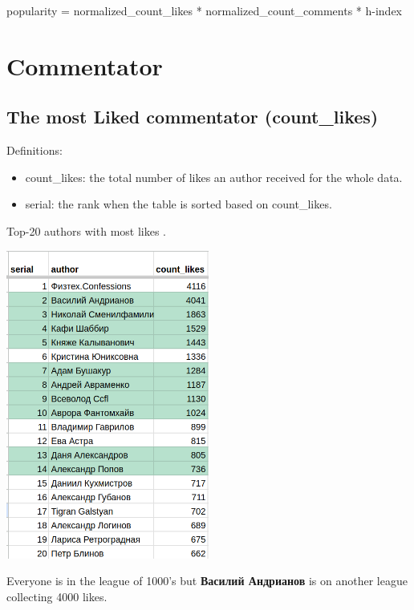 \documentclass[
	12pt
] {article}
\begin{document}
	popularity = normalized\_count\_likes * normalized\_count\_comments * h-index


\section{Commentator}
\subsection{The most Liked commentator (count\_likes)}
	Definitions:
	\begin{itemize}
		\item count\_likes: the total number of likes an author received for the whole data.
		\item serial: the rank when the table is sorted based on count\_likes.
	\end{itemize}

	\begin{table}[H]
		\centering
		\caption{Top-20 authors with most likes \cite{sheet-count-likes}.}
		\label{table-count-likes}
		\includegraphics[width=0.5\textwidth]{table-count-likes-488}
	\end{table}

	Everyone is in the league of 1000's but \textbf{Василий Андрианов} is on another league collecting \num{4000} likes.
\end{document}
